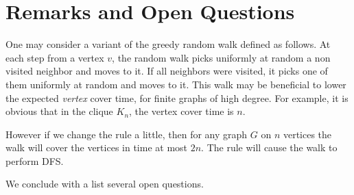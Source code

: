 \documentclass[12pt,a4paper]{article}
\newcommand{\0}{{\bf 0}}
\begin{document}
    \begin{figure}[htbp]
    \end{figure}

\newpage
\section{Remarks and Open Questions}\label{sec:remarks}

    One may consider a variant of the greedy random walk defined as follows.
    At each step from a vertex $v$, the random walk picks uniformly at random a non visited neighbor
    and moves to it. If all neighbors were visited, it picks one of them uniformly at random and moves to it.
    This walk may be beneficial to lower the expected \emph{vertex} cover time, for finite graphs of high degree.
    For example, it is obvious that in the clique $K_n$, the vertex cover time is $n$.
    
    However if we change the rule a little, then for any graph $G$ on $n$ vertices
    the walk will cover the vertices in time at most $2n$.
    The rule will cause the walk to perform DFS.

    \bigskip

    We conclude with a list several open questions.
\end{document}
